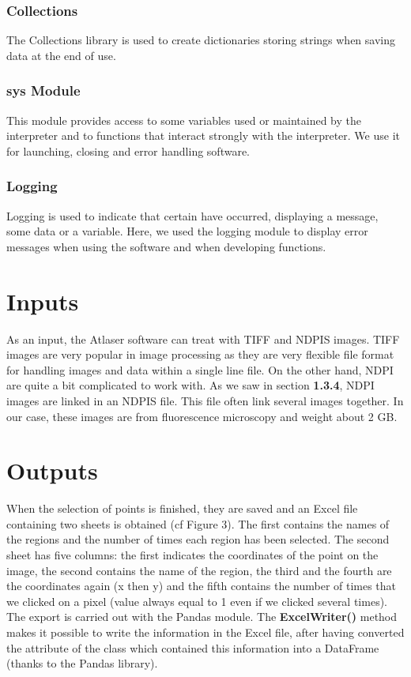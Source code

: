 \documentclass[a4paper,12pt]{report}
\begin{document}
\subsubsection{Collections}
The Collections library is used to create dictionaries storing strings when saving data at the end of use. \\
\subsubsection{sys Module}
This module provides access to some variables used or maintained by the interpreter and to functions that interact strongly with the interpreter. We use it for launching, closing and error handling software. \\

\subsubsection{Logging}
Logging is used to indicate that certain have occurred, displaying a message, some data or a variable.
Here, we used the logging module to display error messages when using the software and when developing functions.\\

\section{Inputs}
As an input, the Atlaser software can treat with TIFF and NDPIS images. TIFF images are very popular in image processing as they are very flexible file format for handling images and data within a single line file. On the other hand, NDPI are quite a bit complicated to work with. As we saw in section \textbf{1.3.4}, NDPI images are linked in an NDPIS file. This file often link several images together. In our case, these images are from fluorescence microscopy and weight about 2 GB.

\section{Outputs}
When the selection of points is finished, they are saved and an Excel file containing two sheets is obtained (cf Figure 3). The first contains the names of the regions and the number of times each region has been selected. The second sheet has five columns: the first indicates the coordinates of the point on the image, the second contains the name of the region, the third and the fourth are the coordinates again (x then y) and the fifth contains the number of times that we clicked on a pixel (value always equal to 1 even if we clicked several times). The export is carried out with the Pandas module. The \textbf{ExcelWriter()} method makes it possible to write the information in the Excel file, after having converted the attribute of the class which contained this information into a DataFrame (thanks to the Pandas library).\\
\end{document}
